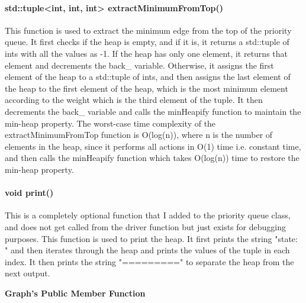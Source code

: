 			\paragraph{{\color{orange} std::tuple<int, int, int> } {\color{draculapurple}extractMinimumFromTop}()}
				This function is used to extract the minimum edge from the top of the priority queue. It first checks if the heap is empty, 
				and if it is, it returns a {\color{draculapurple}std::tuple} of {\color{draculapurple}int}s with all the values as -1. 
				If the heap has only one element, it returns that element and decrements the {\color{Turquoise}back\_} variable. 
				Otherwise, it assigns the first element of the heap to a {\color{draculapurple}std::tuple} of {\color{draculapurple}int}s, 
				and then assigns the last element of the heap to the first element of the heap, which is the most minimum element according to the weight which is the third element of the tuple.
				It then decrements the {\color{Turquoise}back\_} variable and calls the {\color{draculapurple}minHeapify} function to maintain the min-heap property.
				The worst-case time complexity of the {\color{draculapurple}extractMinimumFromTop} function is {\color{lightblue}O(log(n))}, where n 
				is the number of elements in the heap, since it performs all actions in {\color{lightblue}O(1)} time i.e. constant time, and
				then calls the {\color{draculapurple}minHeapify} function which takes {\color{lightblue}O(log(n))} time to restore the min-heap property.

			\paragraph{{\color{orange}void} {\color{draculapurple}print}()}
				This is a completely optional function that I added to the priority queue class, and does not get called from the driver function but just exists for debugging purposes.
				This function is used to print the heap. It first prints the string "state: " and then iterates through the heap and prints the values of the tuple in each index.
				It then prints the string "=========" to separate the heap from the next output.
			
	\begin{center}
		\noindent\hrulefill\raisebox{-.3\ht\strutbox} {\textbf{\Large{Graph's Public Member Function}}}\hrulefill
	\end{center}

